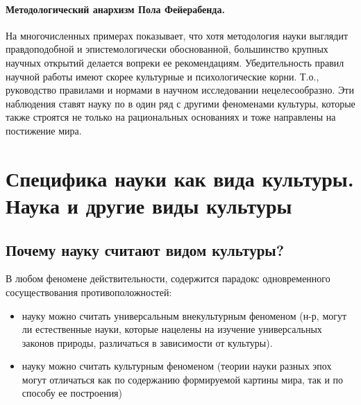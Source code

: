 \paragraph{Методологический анархизм Пола Фейерабенда.}
На многочисленных примерах показывает, что хотя методология науки выглядит правдоподобной и эпистемологически обоснованной, большинство крупных научных открытий делается вопреки ее
рекомендациям. Убедительность правил научной работы имеют скорее культурные и психологические корни. Т.о., руководство правилами и нормами в научном исследовании нецелесообразно.
Эти наблюдения ставят науку по в один ряд с другими феноменами культуры, которые также строятся не только на рациональных основаниях и тоже направлены на постижение мира.

\section{Специфика науки как вида культуры. Наука и другие виды культуры}

\subsection{Почему науку считают видом культуры?} 

В любом феномене действительности, содержится парадокс одновременного сосуществования противоположностей:
\begin{itemize}
    \item науку можно считать универсальным внекультурным феноменом (н-р, могут ли естественные
    науки, которые нацелены на изучение универсальных законов природы, различаться в зависимости от культуры).
    \item науку можно считать культурным феноменом (теории науки разных эпох могут отличаться как по содержанию формируемой картины мира, так и по способу ее построения)
\end{itemize}


